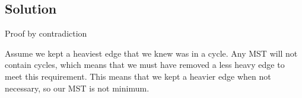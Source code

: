 \subsection*{Solution}

Proof by contradiction

Assume we kept a heaviest edge that we knew was in a cycle. 
Any MST will not contain cycles, which means that we must have removed a less heavy edge to meet this requirement. This means that we kept a heavier edge when not necessary, so our MST is not minimum.
